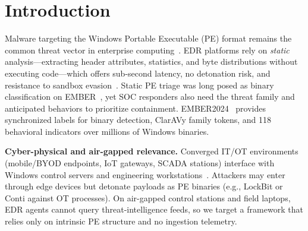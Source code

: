 \documentclass[Number]{sn-jnl}
\begin{document}

\maketitle


\section{Introduction}\label{sec:intro}

Malware targeting the Windows Portable Executable (PE) format remains the common threat vector in enterprise computing~\cite{anderson2018ember,joyce2025ember2024,wadho2026benchmarking}. EDR platforms rely on \emph{static} analysis---extracting header attributes, statistics, and byte distributions without executing code---which offers sub-second latency, no detonation risk, and resistance to sandbox evasion~\cite{anderson2018ember,alojaimi2025advanced,fauzan2026large}. Static PE triage was long posed as binary classification on EMBER~\cite{anderson2018ember}, yet SOC responders also need the threat family and anticipated behaviors to prioritize containment. EMBER2024~\cite{joyce2025ember2024} provides synchronized labels for binary detection, ClarAVy family tokens, and 118 behavioral indicators over millions of Windows binaries.

\noindent\textbf{Cyber-physical and air-gapped relevance.}
Converged IT/OT environments (mobile/BYOD endpoints, IoT gateways, SCADA stations) interface with Windows control servers and engineering workstations~\cite{xiao2024malware,jcsm2025interpretable}. Attackers may enter through edge devices but detonate payloads as PE binaries (e.g., LockBit or Conti against OT processes). On air-gapped control stations and field laptops, EDR agents cannot query threat-intelligence feeds, so we target a framework that relies only on intrinsic PE structure and no ingestion telemetry.
\end{document}
